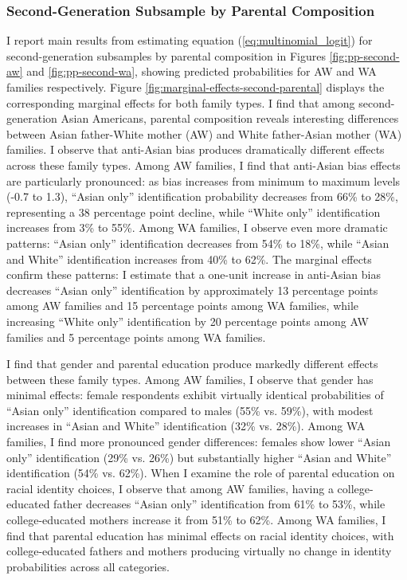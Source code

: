 \subsubsection*{Second-Generation Subsample by Parental Composition}

I report main results from estimating equation (\ref{eq:multinomial_logit}) for second-generation subsamples by parental composition in Figures \ref{fig:pp-second-aw} and \ref{fig:pp-second-wa}, showing predicted probabilities for AW and WA families respectively. Figure \ref{fig:marginal-effects-second-parental} displays the corresponding marginal effects for both family types. I find that among second-generation Asian Americans, parental composition reveals interesting differences between Asian father-White mother (AW) and White father-Asian mother (WA) families. I observe that anti-Asian bias produces dramatically different effects across these family types. Among AW families, I find that anti-Asian bias effects are particularly pronounced: as bias increases from minimum to maximum levels (-0.7 to 1.3), ``Asian only'' identification probability decreases from 66\% to 28\%, representing a 38 percentage point decline, while ``White only'' identification increases from 3\% to 55\%. Among WA families, I observe even more dramatic patterns: ``Asian only'' identification decreases from 54\% to 18\%, while ``Asian and White'' identification increases from 40\% to 62\%. The marginal effects confirm these patterns: I estimate that a one-unit increase in anti-Asian bias decreases ``Asian only'' identification by approximately 13 percentage points among AW families and 15 percentage points among WA families, while increasing ``White only'' identification by 20 percentage points among AW families and 5 percentage points among WA families.

I find that gender and parental education produce markedly different effects between these family types. Among AW families, I observe that gender has minimal effects: female respondents exhibit virtually identical probabilities of ``Asian only'' identification compared to males (55\% vs. 59\%), with modest increases in ``Asian and White'' identification (32\% vs. 28\%). Among WA families, I find more pronounced gender differences: females show lower ``Asian only'' identification (29\% vs. 26\%) but substantially higher ``Asian and White'' identification (54\% vs. 62\%). When I examine the role of parental education on racial identity choices, I observe that among AW families, having a college-educated father decreases ``Asian only'' identification from 61\% to 53\%, while college-educated mothers increase it from 51\% to 62\%. Among WA families, I find that parental education has minimal effects on racial identity choices, with college-educated fathers and mothers producing virtually no change in identity probabilities across all categories.

